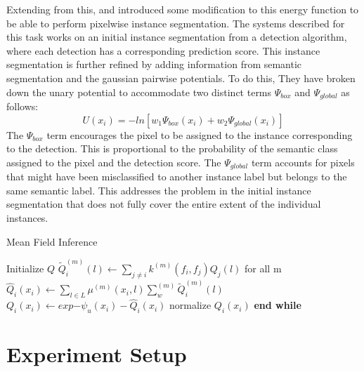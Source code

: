 \documentclass[journal]{IEEEtran}
\begin{document}
Extending from this, \cite{Arnab2017PixelwiseIS} and \cite{Li_2018_ECCV} introduced some modification to this energy function to be able to perform  pixelwise instance segmentation. The systems described for this task works on an initial instance segmentation from a detection algorithm, where each detection has a corresponding prediction score. This instance segmentation is further refined by adding information from semantic segmentation and the gaussian pairwise potentials. To do this, They have broken down the unary potential to accommodate two distinct terms $\Psi_{box}$ and $\Psi_{global}$ as follows:
\begin{equation}
U(x_i) = -ln[w_1\Psi_{box}(x_i) + w_2\Psi_{global}(x_i)]
\end{equation}
The $\Psi_{box}$ term encourages the pixel to be assigned to the instance corresponding to the detection. This is proportional to the probability of the semantic class assigned to the pixel and the detection score. The $\Psi_{global}$ term accounts for pixels that might have been misclassified to another instance label but belongs to the same semantic label. This addresses the problem in the initial instance segmentation that does not fully cover the entire extent of the individual instances.
\begin{algorithm*}
\caption{Mean Field Inference}\label{alg:meanfieldinference}
\begin{algorithmic}[1]
\State Initialize $Q$
\State $\widetilde{Q}_i^{(m)}(l)\gets \sum_{j\neq i}k^{(m)}(f_i,f_j)Q_j(l)$ for all m
\State $\hat{Q}_i(x_i)\gets \sum_{l \in L} \mu^{(m)}(x_i,l)\sum_w^{(m)}\widetilde{Q}_i^{(m)}(l)$
\State $Q_i(x_i)\gets exp{-\psi_u(x_i) - \hat{Q}_i(x_i)}$
\State normalize $Q_i(x_i)$
\EndWhile
\State \textbf{end while}
\end{algorithmic}
\end{algorithm*}

\section{Experiment Setup}
\end{document}

